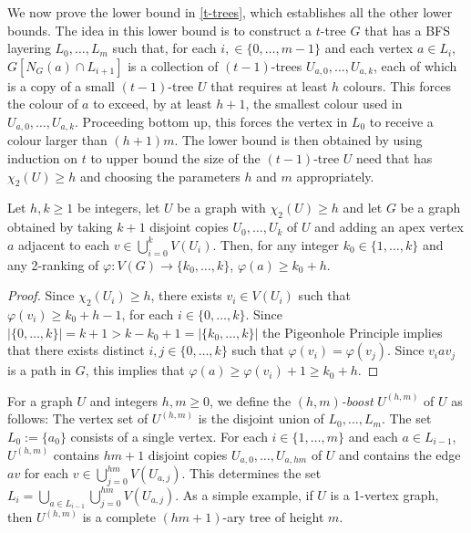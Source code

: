 \documentclass[kpfonts]{patmorin}
\newcommand{\trn}{\chi_2}
\theoremstyle{named}
\begin{document}
We now prove the lower bound in \cref{t-trees}, which establishes all the other lower bounds. The idea in this lower bound is to construct a $t$-tree $G$ that has a BFS layering $L_0,\ldots,L_m$ such that, for each $i,\in\{0,\ldots,m-1\}$ and each vertex $a\in L_i$, $G[N_G(a)\cap L_{i+1}]$ is a collection of $(t-1)$-trees $U_{a,0},\ldots,U_{a,k}$, each of which is a copy of a small $(t-1)$-tree $U$ that requires at least $h$ colours.  This forces the colour of $a$ to exceed, by at least $h+1$, the smallest colour used in $U_{a,0},\ldots,U_{a,k}$.  Proceeding bottom up, this forces the vertex in $L_0$ to receive a colour larger than $(h+1)m$.  The lower bound is then obtained by using induction on $t$ to upper bound the size of the $(t-1)$-tree $U$ need that has $\trn(U)\ge h$ and choosing the parameters $h$ and $m$ appropriately.

\begin{lem}\label{apex-graph}
    Let $h,k\ge 1$ be integers, let $U$ be a graph with $\trn(U)\ge h$ and let $G$ be a graph obtained by taking $k+1$ disjoint copies $U_0,\ldots,U_k$ of $U$ and adding an apex vertex $a$ adjacent to each $v\in\bigcup_{i=0}^k V(U_i)$.  Then, for any integer $k_0\in \{1,\ldots,k\}$ and any 2-ranking of $\varphi:V(G)\to\{k_0,\ldots,k\}$, $\varphi(a) \ge k_0+h$.
\end{lem}

\begin{proof}
    Since $\trn(U_i)\ge h$, there exists $v_i\in V(U_i)$ such that $\varphi(v_i)\ge k_0+h-1$, for each $i\in\{0,\ldots,k\}$.  Since $|\{0,\ldots,k\}|=k+1>k-k_0+1=|\{k_0,\ldots,k\}|$ the Pigeonhole Principle implies that there exists distinct $i,j\in\{0,\ldots,k\}$ such that $\varphi(v_i)=\varphi(v_j)$.  Since $v_i a v_j$ is a path in $G$, this implies that $\varphi(a)\ge \varphi(v_i)+1\ge k_0+h$.
\end{proof}

For a graph $U$ and integers $h,m\ge 0$, we define the \emph{$(h,m)$-boost} $U^{(h,m)}$ of $U$ as follows: The vertex set of $U^{(h,m)}$ is the disjoint union of $L_0,\ldots,L_m$.  The set $L_0:=\{a_0\}$ consists of a single vertex. For each $i\in\{1,\ldots,m\}$ and each $a\in L_{i-1}$, $U^{(h,m)}$ contains $hm+1$ disjoint copies $U_{a,0},\ldots,U_{a,hm}$ of $U$ and contains the edge $av$ for each $v\in\bigcup_{j=0}^{hm} V(U_{a,j})$.  This determines the set $L_i=\bigcup_{a\in L_{i-1}}\bigcup_{j=0}^{hm} V(U_{a,j})$.  As a simple example, if $U$ is a 1-vertex graph, then $U^{(h,m)}$ is a complete $(hm+1)$-ary tree of height $m$.
\end{document}
